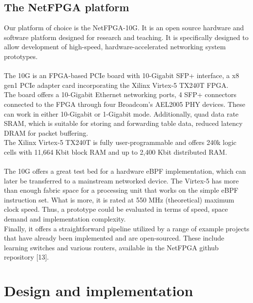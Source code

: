 \documentclass{l4proj}
\begin{document}
\section{The NetFPGA platform}
Our platform of choice is the NetFPGA-10G. It is an open source hardware and software platform designed for research and teaching. It is specifically designed to allow development of high-speed, hardware-accelerated networking system prototypes.\\\\
The 10G is an FPGA-based PCIe board with 10-Gigabit SFP+ interface, a x8 gen1 PCIe adapter card incorporating the Xilinx Virtex-5 TX240T FPGA.\\
The board offers a 10-Gigabit Ethernet networking ports, 4 SFP+ connectors connected to the FPGA through four Broadcom’s AEL2005 PHY devices. These can work in either 10-Gigabit or 1-Gigabit mode. Additionally, quad data rate SRAM, which is suitable for storing and forwarding table data, reduced latency DRAM for packet buffering.\\
The Xilinx Virtex-5 TX240T is fully user-programmable and offers 240k logic cells with 11,664 Kbit block RAM and up to 2,400 Kbit distributed RAM.\\\\
The 10G offers a great test bed for a hardware eBPF implementation, which can later be transferred to a mainstream networked device. The Virtex-5 has more than enough fabric space for a processing unit that works on the simple eBPF instruction set. What is more, it is rated at 550 MHz (theoretical) maximum clock speed. Thus, a prototype could be evaluated in terms of speed, space demand and implementation complexity.\\
Finally, it offers a straightforward pipeline utilized by a range of example projects that have already been implemented and are open-sourced. These include learning switches and various routers, available in the NetFPGA github repository [13].

 

\chapter{Design and implementation}
\end{document}
